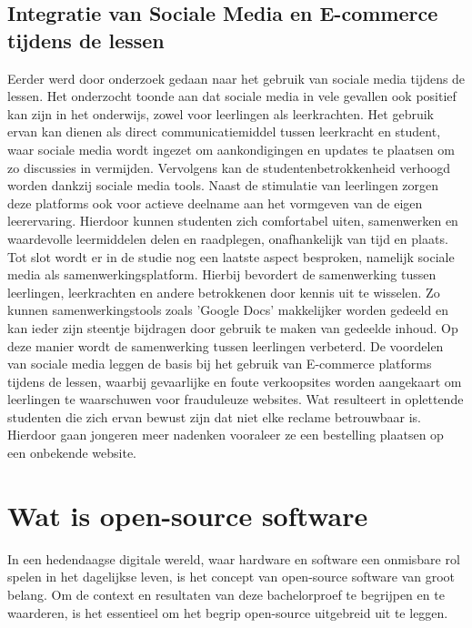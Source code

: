 \subsection{Integratie van Sociale Media en E-commerce tijdens de lessen}
Eerder werd door \textcite{Purwanto2023} onderzoek gedaan naar het gebruik van sociale media tijdens de lessen. Het onderzocht toonde aan dat sociale media in vele gevallen ook positief kan zijn in het onderwijs, zowel voor leerlingen als leerkrachten. Het gebruik ervan kan dienen als direct communicatiemiddel tussen leerkracht en student, waar sociale media wordt ingezet om aankondigingen en updates te plaatsen om zo discussies in vermijden. 
Vervolgens kan de studentenbetrokkenheid verhoogd worden dankzij sociale media tools. Naast de stimulatie van leerlingen zorgen deze platforms ook voor actieve deelname aan het vormgeven van de eigen leerervaring. Hierdoor kunnen studenten zich comfortabel uiten, samenwerken en waardevolle leermiddelen delen en raadplegen, onafhankelijk van tijd en plaats. \newline
Tot slot wordt er in de studie nog een laatste aspect besproken, namelijk sociale media als samenwerkingsplatform. Hierbij bevordert de samenwerking tussen leerlingen, leerkrachten en andere betrokkenen door kennis uit te wisselen. Zo kunnen samenwerkingstools zoals 'Google Docs' makkelijker worden gedeeld en kan ieder zijn steentje bijdragen door gebruik te maken van gedeelde inhoud. Op deze manier wordt de samenwerking tussen leerlingen verbeterd. \newline
De voordelen van sociale media leggen de basis bij het gebruik van E-commerce platforms tijdens de lessen, waarbij gevaarlijke en foute verkoopsites worden aangekaart om leerlingen te waarschuwen voor frauduleuze websites. Wat resulteert in oplettende studenten die zich ervan bewust zijn dat niet elke reclame betrouwbaar is. Hierdoor gaan jongeren meer nadenken vooraleer ze een bestelling plaatsen op een onbekende website. \autocite{Purwanto2023} \autocite{onlinefraude}

\section{Wat is open-source software}
In een hedendaagse digitale wereld, waar hardware en software een onmisbare rol spelen in het dagelijkse leven, is het concept van open-source software van groot belang. Om de context en resultaten van deze bachelorproef te begrijpen en te waarderen, is het essentieel om het begrip open-source uitgebreid uit te leggen.\newline

